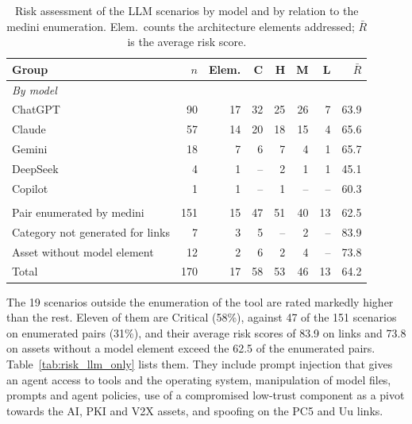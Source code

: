 \begin{table}[htbp]
\centering
\caption{Risk assessment of the LLM scenarios by model and by relation to the
medini enumeration. Elem.\ counts the architecture elements addressed; $\bar{R}$
is the average risk score.}
\label{tab:risk_llm}
\footnotesize
\setlength{\tabcolsep}{3.2pt}
\begin{tabularx}{\columnwidth}{Xrrrrrrr}
\toprule
\textbf{Group} & \textbf{$n$} & \textbf{Elem.} & \textbf{C} & \textbf{H} & \textbf{M} & \textbf{L} & \textbf{$\bar{R}$} \\
\midrule
\multicolumn{8}{l}{\textit{By model}} \\
\quad ChatGPT & 90 & 17 & 32 & 25 & 26 & 7 & 63.9 \\
\quad Claude & 57 & 14 & 20 & 18 & 15 & 4 & 65.6 \\
\quad Gemini & 18 & 7 & 6 & 7 & 4 & 1 & 65.7 \\
\quad DeepSeek & 4 & 1 & -- & 2 & 1 & 1 & 45.1 \\
\quad Copilot & 1 & 1 & -- & 1 & -- & -- & 60.3 \\
\addlinespace[2pt]
\multicolumn{8}{l}{\textit{By relation to the medini enumeration}} \\
\quad Pair enumerated by medini & 151 & 15 & 47 & 51 & 40 & 13 & 62.5 \\
\quad Category not generated for links & 7 & 3 & 5 & -- & 2 & -- & 83.9 \\
\quad Asset without model element & 12 & 2 & 6 & 2 & 4 & -- & 73.8 \\
\midrule
Total & 170 & 17 & 58 & 53 & 46 & 13 & 64.2 \\
\bottomrule
\end{tabularx}
\end{table}

The 19 scenarios outside the enumeration of the tool are rated markedly higher
than the rest. Eleven of them are Critical (58\%), against 47 of the 151
scenarios on enumerated pairs (31\%), and their average risk scores of 83.9 on
links and 73.8 on assets without a model element exceed the 62.5 of the
enumerated pairs. Table~\ref{tab:risk_llm_only} lists them. They include prompt
injection that gives an agent access to tools and the operating system,
manipulation of model files, prompts and agent policies, use of a compromised
low-trust component as a pivot towards the AI, PKI and V2X assets, and
spoofing on the PC5 and Uu links.

